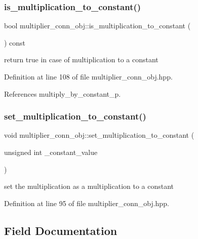 \subsubsection{\texorpdfstring{is\+\_\+multiplication\+\_\+to\+\_\+constant()}{is\_multiplication\_to\_constant()}}
{\footnotesize\ttfamily bool multiplier\+\_\+conn\+\_\+obj\+::is\+\_\+multiplication\+\_\+to\+\_\+constant (\begin{DoxyParamCaption}{ }\end{DoxyParamCaption}) const\hspace{0.3cm}{\ttfamily [inline]}}



return true in case of multiplication to a constant 



Definition at line 108 of file multiplier\+\_\+conn\+\_\+obj.\+hpp.



References multiply\+\_\+by\+\_\+constant\+\_\+p.

\mbox{\label{classmultiplier__conn__obj_ac7a35e042e44540509771cd1d1a7842a}} 
\subsubsection{\texorpdfstring{set\+\_\+multiplication\+\_\+to\+\_\+constant()}{set\_multiplication\_to\_constant()}}
{\footnotesize\ttfamily void multiplier\+\_\+conn\+\_\+obj\+::set\+\_\+multiplication\+\_\+to\+\_\+constant (\begin{DoxyParamCaption}\item[{unsigned int}]{\+\_\+constant\+\_\+value }\end{DoxyParamCaption})\hspace{0.3cm}{\ttfamily [inline]}}



set the multiplication as a multiplication to a constant 



Definition at line 95 of file multiplier\+\_\+conn\+\_\+obj.\+hpp.



\subsection{Field Documentation}
\mbox{\label{classmultiplier__conn__obj_a3b4469122efc43e24cdde0102b3d0e71}} 
